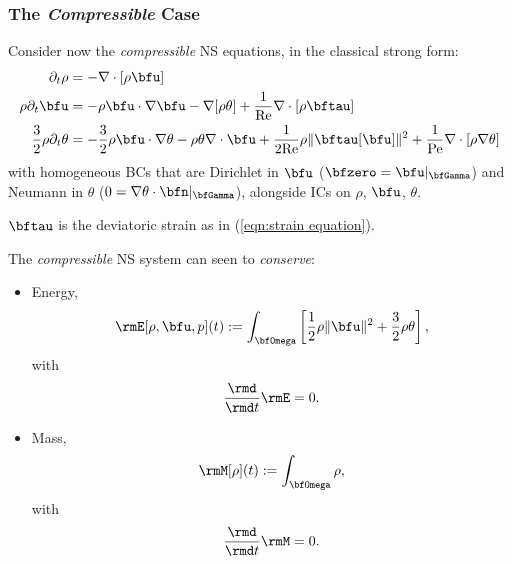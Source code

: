 \subsubsection*{The \emph{Compressible} Case}
    Consider now the \emph{compressible} NS equations, in the classical strong form:
    \begin{align}
                           \partial_{t}\rho  &=  - \nabla\cdot[\rho\bfu]  \label{eqn:compressible NS mass equation}  \\
                       \rho\partial_{t}\bfu  &=  - \rho\bfu\cdot\nabla\bfu - \nabla[\rho\theta] + \frac{1}{\rmRe}\nabla\cdot[\rho\bftau]  \label{eqn:compressible NS momentum equation}  \\
        \frac{3}{2}\rho\partial_{t}\theta  &=  - \frac{3}{2}\rho\bfu\cdot\nabla\theta - \rho\theta\nabla\cdot\bfu + \frac{1}{2\rmRe}\rho\|\bftau[\bfu]\|^{2} + \frac{1}{\rmPe}\nabla\cdot[\rho\nabla\theta]  \label{eqn:compressible NS energy equation}
    \end{align}
    with homogeneous BCs that are Dirichlet in $\bfu$ ($\bfzero  =  \bfu|_{\bfGamma}$) and Neumann in $\theta$ ($0  =  \nabla\theta\cdot\bfn|_{\bfGamma}$), alongside ICs on $\rho$, $\bfu$, $\theta$.
    
    $\bftau$ is the deviatoric strain as in (\ref{eqn:strain equation}).

    \shortline

    The \emph{compressible} NS system can seen to \emph{conserve}:
    \begin{itemize}
        \item  Energy,
        \begin{equation}\label{eqn:compressible NS energy definition}
            \rmE[\rho, \bfu, p](t)  :=  \int_{\bfOmega}\left[\frac{1}{2}\rho\|\bfu\|^{2} + \frac{3}{2}\rho\theta\right],
        \end{equation}
        with
        \begin{equation}
            \frac{\rmd}{\rmd t}\rmE  =  0.
        \end{equation}
        \item  Mass,
        \begin{equation}\label{eqn:compressible NS mass definition}
            \rmM[\rho](t)  :=  \int_{\bfOmega}\rho,
        \end{equation}
        with
        \begin{equation}
            \frac{\rmd}{\rmd t}\rmM  =  0.
        \end{equation}
    \end{itemize}

